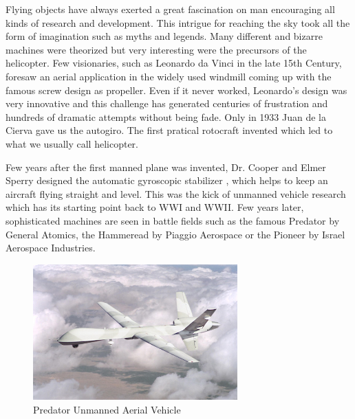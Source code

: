 Flying objects have always exerted a great fascination on man encouraging all kinds of research and development. This intrigue for reaching the sky took all the form of imagination such as myths and legends. Many different and bizarre machines were theorized but very interesting were the precursors of the helicopter. Few visionaries, such as Leonardo da Vinci in the late 15th Century, foresaw an aerial application in the widely used windmill \cite{Heli} coming up with the famous screw design as propeller. Even if it never worked, Leonardo's design was very innovative and this challenge has generated centuries of frustration and hundreds of dramatic attempts without being fade. Only in 1933 Juan de la Cierva gave us the autogiro. The first pratical rotocraft invented which led to what we usually call helicopter. \par Few years after the first manned plane was invented, Dr. Cooper and Elmer Sperry designed the automatic gyroscopic stabilizer \cite{gyro}, which helps to keep an aircraft flying straight and level. This was the kick of unmanned vehicle research which has its starting point back to WWI and WWII. Few years later, sophisticated machines are seen in battle fields such as the famous Predator by General Atomics, the Hammeread by Piaggio Aerospace or the Pioneer by Israel Aerospace Industries. 
\begin{figure}[h]
\centering
 \includegraphics[width=0.7\textwidth]{predator.jpg}
 \caption[Predator UAV]{Predator Unmanned Aerial Vehicle }
 \label{figure:predator}
\end{figure}

